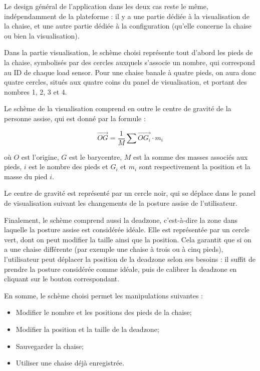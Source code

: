 \documentclass{polytech/polytech}
\begin{document}
Le design général de l'application dans les deux cas reste le même, indépendamment de la plateforme : il y a une partie dédiée à la visualisation de la chaise, et une autre partie dédiée à la configuration (qu'elle concerne la chaise ou bien la visualisation). 

Dans la partie visualisation, le schème choisi représente tout d'abord les pieds de la chaise, symbolisés par des cercles auxquels s'associe un nombre, qui correspond au ID de chaque load sensor. Pour une chaise banale à quatre pieds, on aura donc quatre cercles, situés aux quatre coins du panel de visualisation, et portant des nombres 1, 2, 3 et 4. 

Le schème de la visualisation comprend en outre le centre de gravité de la personne assise, qui est donné par la formule :

$$\vec{OG} = \frac{1}{M} \sum \vec{OG_i} \cdot m_i$$

où $O$ est l'origine, $G$ est le barycentre, $M$ est la somme des masses associés aux pieds, $i$ est le nombre des pieds et $G_i$ et $m_i$ sont respectivement la position et la masse du pied $i$.

Le centre de gravité est représenté par un cercle noir, qui se déplace dans le panel de visualisation suivant les changements de la posture assise de l'utilisateur.

Finalement, le schème comprend aussi la deadzone, c'est-à-dire la zone dans laquelle la posture assise est considérée idéale. Elle est représentée par un cercle vert, dont on peut modifier la taille ainsi que la position. Cela garantit que si on a une chaise différente (par exemple une chaise à trois ou à cinq pieds), l'utilisateur peut déplacer la position de la deadzone selon ses besoins : il suffit de prendre la posture considérée comme idéale, puis de calibrer la deadzone en cliquant sur le bouton correspondant.

En somme, le schème choisi permet les manipulations suivantes :
\begin{itemize}
\item Modifier le nombre et les positions des pieds de la chaise;
\item Modifier la position et la taille de la deadzone;
\item Sauvegarder la chaise;
\item Utiliser une chaise déjà enregistrée.
\end{itemize}
\end{document}
